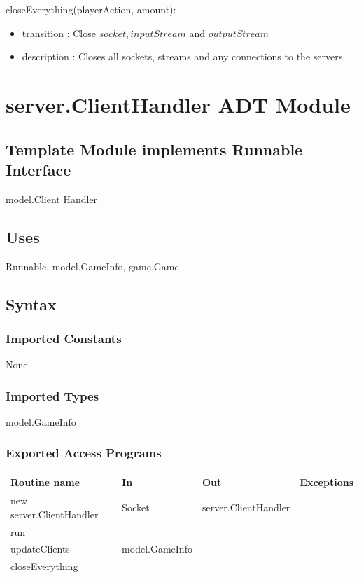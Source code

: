 \documentclass[12pt, titlepage]{article}
\begin{document}
        \noindent closeEverything(playerAction, amount):
        \begin{itemize}
        \item transition : Close $socket, inputStream$ and $outputStream$
        \item description : Closes all sockets,  streams and any connections to the servers.
        \end{itemize}
                
                
        
\section* {server.ClientHandler ADT Module}
    \subsection* {Template Module implements Runnable Interface}
    model.Client Handler
    \subsection* {Uses}
    Runnable, model.GameInfo, game.Game
    \subsection* {Syntax}
    
        \subsubsection* {Imported Constants}
            None
        \subsubsection* {Imported Types}
            model.GameInfo
        \subsubsection* {Exported Access Programs}
        
        \begin{tabular}{| l | l | l | p{6cm} |}
            \hline
            \textbf{Routine name} & \textbf{In} & \textbf{Out} & \textbf{Exceptions}\\
            \hline
            new server.ClientHandler & Socket & server.ClientHandler & \\
            \hline
            run &  &  & \\
            \hline 
            updateClients & model.GameInfo &  &\\
            \hline 
            closeEverything & & &\\
            \hline
        \end{tabular}
        
\end{document}
